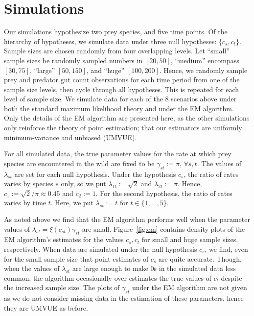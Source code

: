 \section*{Simulations}
\label{sec:sim}

Our simulations hypothesize two prey species, and five time points.  Of the hierarchy of hypotheses, we simulate data under three null hypotheses: $\{c_s, c_t\}$.  Sample sizes are chosen randomly from four overlapping levels.  Let ``small'' sample sizes be randomly sampled numbers in $[20,50]$, ``medium'' encompass $[30,75]$, ``large'' $[50,150]$, and ``huge'' $[100,200]$.  Hence, we randomly sample prey and predator gut count observations for each time period from one of the sample size levels, then cycle through all hypotheses.  This is repeated for each level of sample size.  We simulate data for each of the $8$ scenarios above under both the standard maximum likelihood theory and under the EM algorithm.  Only the details of the EM algorithm are presented here, as the other simulations only reinforce the theory of point estimation; that our estimators are uniformly minimum-variance and unbiased (UMVUE).

For all simulated data, the true parameter values for the rate at which prey species are encountered in the wild are fixed to be $\gamma_{st} := \pi, \, \forall s,t$. The values of $\lambda_{st}$ are set for each null hypothesis.  Under the hypothesis $c_s$, the ratio of rates varies by species $s$ only, so we put $\lambda_{1t} := \sqrt{2}$ and $\lambda_{2t} := \pi$.  Hence, $c_1 := \sqrt{2}/\pi \approx 0.45$ and $c_2 := 1$.  For the second hypothesis, the ratio of rates varies by time $t$.  Here, we put $\lambda_{st} := t$ for $t \in \{1, \ldots, 5 \}$.  

As noted above we find that the EM algorithm performs well when the parameter values of $\lambda_{st} = \xi(c_{st})\gamma_{st}$ are small.  Figure~\ref{fig:em} contains density plots of the EM algorithm's estimates for the values $c_s,c_t$ for small and huge sample sizes, respectively.  When data are simulated under the null hypothesis $c_s$, we find, even for the small sample size that point estimates of $c_s$ are quite accurate.  Though, when the values of $\lambda_{st}$ are large enough to make $0$s in the simulated data less common, the algorithm occasionally over-estimates the true values of $c_t$ despite the increased sample size.  The plots of $\gamma_{st}$ under the EM algorithm are not given as we do not consider missing data in the estimation of these parameters, hence they are UMVUE as before. 

